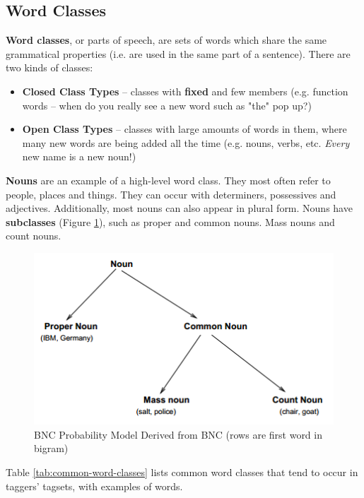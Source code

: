\documentclass{article}
\begin{document}
\subsection{Word Classes}

\textbf{Word classes}, or parts of speech, are sets of words which share the same grammatical properties (i.e. are used in the same part of a sentence). There are two kinds of classes:
\begin{itemize}
	\item \textbf{Closed Class Types} -- classes with \textbf{fixed} and few members (e.g. function words -- when do you really see a new word such as "the" pop up?)
	\item \textbf{Open Class Types} -- classes with large amounts of words in them, where many new words are being added all the time (e.g. nouns, verbs, etc. \textit{Every} new name is a new noun!)
\end{itemize}

\textbf{Nouns} are an example of a high-level word class. They most often refer to people, places and things. They can occur with determiners, possessives and adjectives. Additionally, most nouns can also appear in plural form. Nouns have \textbf{subclasses} (Figure \ref{fig:noun-class-hierarchy}), such as proper and common nouns. Mass nouns and count nouns.

\begin{figure}
	\centering
	\includegraphics[scale=0.65]{figures/noun-class-hierarchy.png}
	\caption{BNC Probability Model Derived from BNC (rows are first word in bigram)}
	\label{fig:noun-class-hierarchy}
\end{figure}

Table \ref{tab:common-word-classes} lists common word classes that tend to occur in taggers' tagsets, with examples of words.
\end{document}
